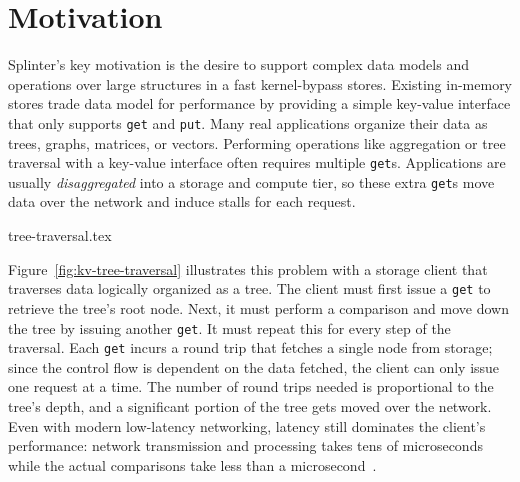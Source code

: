 \section{Motivation}
\label{sec:motivation}



Splinter's key motivation is the desire to support complex 
    data models and operations over large structures in a fast kernel-bypass
    stores.
Existing in-memory stores trade data model for performance by
  providing a simple key-value interface that only supports \texttt{get} and
  \texttt{put}.
Many real applications organize their data as trees, graphs, matrices, or vectors.
Performing operations like aggregation or tree traversal with a
  key-value interface often requires multiple \texttt{get}s.
Applications are usually \textsl{disaggregated} into a storage and
  compute tier, so these extra \texttt{get}s move data over the network
  and induce stalls for each request.

 {tree-traversal.tex}

Figure~\ref{fig:kv-tree-traversal} illustrates this problem with a
storage client that traverses data logically organized as a tree.
The client must first issue
a \texttt{get} to retrieve the tree's root node.
Next, it must perform a comparison and move down the tree by
issuing another \texttt{get}. It must repeat this
for every step of the traversal. Each \texttt{get} incurs a
round trip that fetches a single node from storage; since
the control flow is dependent on the data fetched, the client can only issue
one request at a time. The
number of round trips needed is proportional to the tree's depth, and a
significant portion of the tree gets moved over the network. Even with
modern low-latency networking, latency still dominates the client's performance:
network transmission and processing takes tens of
microseconds while the actual comparisons take less than a
microsecond~\cite{ramcloud}.

